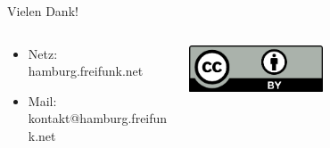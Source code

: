 \documentclass[c]{beamer}
\begin{document}
\begin{frame}{Vielen Dank!}
	\begin{columns}
		\begin{column}{0.6\textwidth}
			\begin{itemize}
				\item Netz: hamburg.freifunk.net
				\item Mail: kontakt@hamburg.freifunk.net
		\end{itemize}
		\end{column}
		\begin{column}{0.5\textwidth}
			\begin{center}
				\includegraphics[width=0.5\textwidth]{Bilder/cc-by}
			\end{center}
		\end{column}
	\end{columns}
\end{frame}
\end{document}
